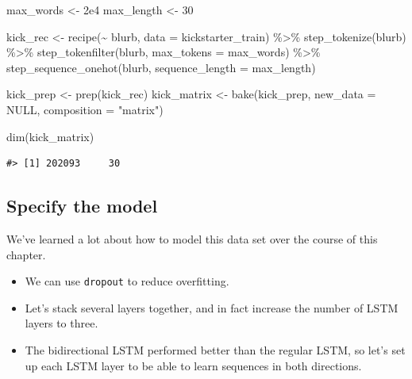\documentclass[
]{krantz}
\makeatletter
\newenvironment{Shaded}{\begin{snugshade}}{\end{snugshade}}
\newcommand{\AttributeTok}[1]{\textcolor[rgb]{0.77,0.63,0.00}{#1}}
\newcommand{\ConstantTok}[1]{\textcolor[rgb]{0.00,0.00,0.00}{#1}}
\newcommand{\DecValTok}[1]{\textcolor[rgb]{0.00,0.00,0.81}{#1}}
\newcommand{\FloatTok}[1]{\textcolor[rgb]{0.00,0.00,0.81}{#1}}
\newcommand{\FunctionTok}[1]{\textcolor[rgb]{0.00,0.00,0.00}{#1}}
\newcommand{\NormalTok}[1]{#1}
\newcommand{\OtherTok}[1]{\textcolor[rgb]{0.56,0.35,0.01}{#1}}
\newcommand{\SpecialCharTok}[1]{\textcolor[rgb]{0.00,0.00,0.00}{#1}}
\newcommand{\StringTok}[1]{\textcolor[rgb]{0.31,0.60,0.02}{#1}}
\newenvironment{kframe}{%
\medskip{}
\setlength{\fboxsep}{.8em}
 \def\at@end@of@kframe{}%
 \ifinner\ifhmode%
  \def\at@end@of@kframe{\end{minipage}}%
  \begin{minipage}{\columnwidth}%
 \fi\fi%
 \def\FrameCommand##1{\hskip\@totalleftmargin \hskip-\fboxsep
 \colorbox{shadecolor}{##1}\hskip-\fboxsep
     \hskip-\linewidth \hskip-\@totalleftmargin \hskip\columnwidth}%
 \MakeFramed {\advance\hsize-\width
   \@totalleftmargin\z@ \linewidth\hsize
   \@setminipage}}%
 {\par\unskip\endMakeFramed%
 \at@end@of@kframe}
\renewenvironment{Shaded}{\begin{kframe}}{\end{kframe}}
\makeatother
\begin{document}
\begin{Shaded}
\begin{Highlighting}[]
\NormalTok{max\_words }\OtherTok{\textless{}{-}} \FloatTok{2e4}
\NormalTok{max\_length }\OtherTok{\textless{}{-}} \DecValTok{30}

\NormalTok{kick\_rec }\OtherTok{\textless{}{-}} \FunctionTok{recipe}\NormalTok{(}\SpecialCharTok{\textasciitilde{}}\NormalTok{ blurb, }\AttributeTok{data =}\NormalTok{ kickstarter\_train) }\SpecialCharTok{\%\textgreater{}\%}
  \FunctionTok{step\_tokenize}\NormalTok{(blurb) }\SpecialCharTok{\%\textgreater{}\%}
  \FunctionTok{step\_tokenfilter}\NormalTok{(blurb, }\AttributeTok{max\_tokens =}\NormalTok{ max\_words) }\SpecialCharTok{\%\textgreater{}\%}
  \FunctionTok{step\_sequence\_onehot}\NormalTok{(blurb, }\AttributeTok{sequence\_length =}\NormalTok{ max\_length)}

\NormalTok{kick\_prep }\OtherTok{\textless{}{-}} \FunctionTok{prep}\NormalTok{(kick\_rec)}
\NormalTok{kick\_matrix }\OtherTok{\textless{}{-}} \FunctionTok{bake}\NormalTok{(kick\_prep, }\AttributeTok{new\_data =} \ConstantTok{NULL}\NormalTok{, }\AttributeTok{composition =} \StringTok{"matrix"}\NormalTok{)}

\FunctionTok{dim}\NormalTok{(kick\_matrix)}
\end{Highlighting}
\end{Shaded}

\begin{verbatim}
#> [1] 202093     30
\end{verbatim}

\hypertarget{lstmfullmodel}{%
\subsection{Specify the model}\label{lstmfullmodel}}

We've learned a lot about how to model this data set over the course of this chapter.

\begin{itemize}
\item
  We can use \texttt{dropout} to reduce overfitting.
\item
  Let's stack several layers together, and in fact increase the number of LSTM layers to three.
\item
  The bidirectional LSTM performed better than the regular LSTM, so let's set up each LSTM layer to be able to learn sequences in both directions.
\end{itemize}
\end{document}
